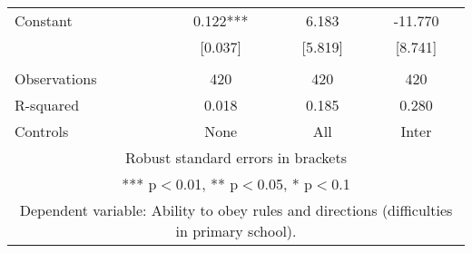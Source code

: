 \begin{tabular}{lccc}
Constant & 0.122*** & 6.183 & -11.770 \\
 & [0.037] & [5.819] & [8.741] \\
 &  &  &  \\
Observations & 420 & 420 & 420 \\
R-squared & 0.018 & 0.185 & 0.280 \\
 Controls & None & All & Inter \\ \hline
\multicolumn{4}{c}{ Robust standard errors in brackets} \\
\multicolumn{4}{c}{ *** p$<$0.01, ** p$<$0.05, * p$<$0.1} \\
\multicolumn{4}{c}{ Dependent variable: Ability to obey rules and directions (difficulties in primary school).} \\
\end{tabular}
